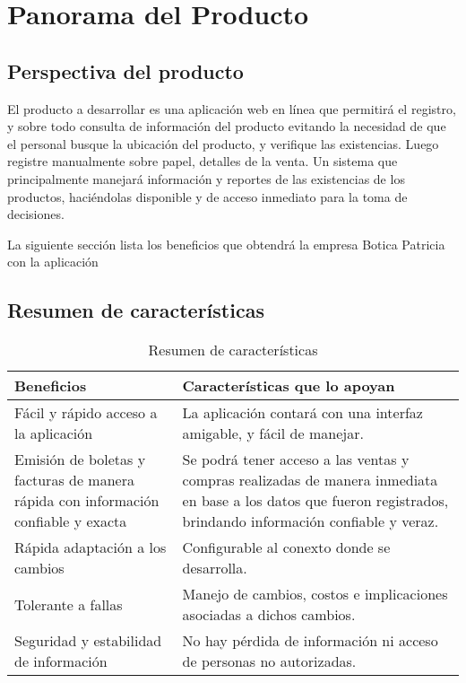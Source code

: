 \documentclass[a4paper,11pt, spanish]{report}
\begin{document}
{{{{    \section{Panorama del Producto}
      \subsection{Perspectiva del producto}
        El producto a desarrollar es una aplicación web en línea que permitirá el registro, y sobre todo consulta de información del producto evitando la necesidad de que el personal busque la ubicación del producto, y verifique las existencias. Luego registre manualmente sobre papel, detalles de la venta. Un sistema que principalmente manejará información y reportes de las existencias de los productos, haciéndolas disponible y de acceso inmediato para la toma de decisiones.
        
        La siguiente sección lista los beneficios que obtendrá la empresa Botica Patricia con la aplicación
        
      \subsection{Resumen de características}
        {\renewcommand{\arraystretch}{1.7}%
        \noindent\begin{table}[H]
        \noindent\begin{tabularx}{\textwidth}{X|X}
          \textbf {\large Beneficios} & \textbf{ \large Características que lo apoyan} \\
          \hline Fácil y rápido acceso a la aplicación & La aplicación contará con una interfaz amigable, y fácil de manejar. \\
          Emisión de boletas y facturas de manera rápida con información confiable y exacta & Se podrá tener acceso a las ventas y compras realizadas de manera inmediata en base a los datos que fueron registrados, brindando información confiable y veraz.\\
          Rápida adaptación a los cambios & Configurable al conexto donde se desarrolla. \\
          Tolerante a fallas & Manejo de cambios, costos e implicaciones asociadas a dichos cambios.\\
          Seguridad y estabilidad de información & No hay pérdida de información ni acceso de personas no autorizadas.\\
        \end{tabularx}
        \caption{Resumen de características}
        \end{table}
}}}}}
\end{document}
